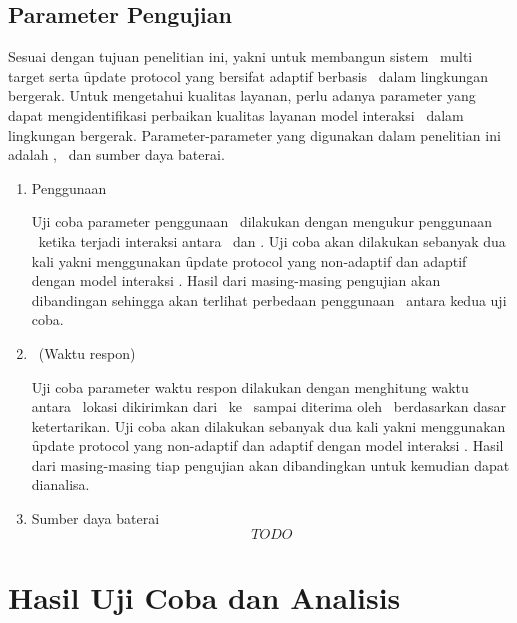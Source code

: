 
\subsection{Parameter Pengujian}

Sesuai dengan tujuan penelitian ini, yakni untuk membangun sistem
\tracking~multi target serta \f{update protocol} yang bersifat adaptif berbasis
\pubsub~dalam lingkungan bergerak. Untuk mengetahui kualitas layanan, perlu
adanya parameter yang dapat mengidentifikasi perbaikan kualitas layanan model
interaksi \pubsub~dalam lingkungan bergerak. Parameter-parameter yang digunakan
dalam penelitian ini adalah \bandwidth, \latency~dan sumber daya baterai.

\begin{enumerate}
  [label=\alph*.
  ,noitemsep
  ,nolistsep
  ,leftmargin=0cm
  ,itemindent=.5cm
  ,listparindent=\parindent
  ]

  \item Penggunaan \bandwidth

  Uji coba parameter penggunaan \bandwidth~dilakukan dengan mengukur penggunaan
  \bandwidth~ketika terjadi interaksi antara \server~dan \client. Uji coba akan
  dilakukan sebanyak dua kali yakni menggunakan \f{update protocol} yang
  non-adaptif dan adaptif dengan model interaksi \pubsub. Hasil dari
  masing-masing pengujian akan dibandingan sehingga akan terlihat perbedaan
  penggunaan \bandwidth~antara kedua uji coba.

  \item \Latency~(Waktu respon)

  Uji coba parameter waktu respon dilakukan dengan menghitung waktu antara
  \publish~lokasi dikirimkan dari \publisher~ke \server~sampai diterima oleh
  \subscriber~berdasarkan dasar ketertarikan. Uji coba akan dilakukan sebanyak
  dua kali yakni menggunakan \f{update protocol} yang non-adaptif dan adaptif
  dengan model interaksi \pubsub. Hasil dari masing-masing tiap pengujian akan
  dibandingkan untuk kemudian dapat dianalisa.

  \item Sumber daya baterai
    \[TODO\]

\end{enumerate}



\section{Hasil Uji Coba dan Analisis}
